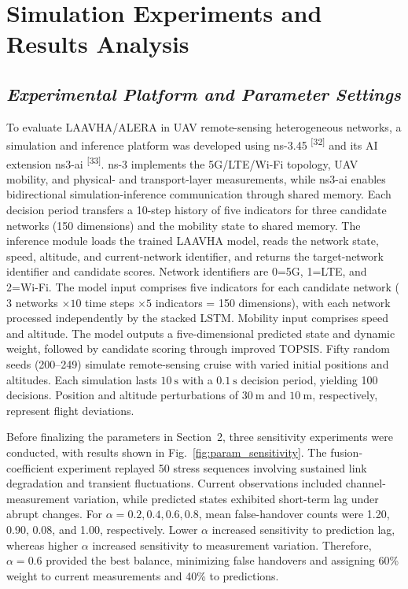 \documentclass[10pt,a4paper]{article}
\newcommand{\upcite}[1]{\textsuperscript{[#1]}}
\begin{document}
\section{Simulation Experiments and Results Analysis}

\subsection{\textmd{\textit{Experimental Platform and Parameter Settings}}}

To evaluate LAAVHA/ALERA in UAV remote-sensing heterogeneous networks, a simulation and inference platform was developed using ns-3.45 \upcite{32} and its AI extension ns3-ai \upcite{33}. ns-3 implements the 5G/LTE/Wi-Fi topology, UAV mobility, and physical- and transport-layer measurements, while ns3-ai enables bidirectional simulation-inference communication through shared memory. Each decision period transfers a 10-step history of five indicators for three candidate networks (150 dimensions) and the mobility state to shared memory. The inference module loads the trained LAAVHA model, reads the network state, speed, altitude, and current-network identifier, and returns the target-network identifier and candidate scores. Network identifiers are 0=5G, 1=LTE, and 2=Wi-Fi. The model input comprises five indicators for each candidate network ($3$ networks $\times10$ time steps $\times5$ indicators = 150 dimensions), with each network processed independently by the stacked LSTM. Mobility input comprises speed and altitude. The model outputs a five-dimensional predicted state and dynamic weight, followed by candidate scoring through improved TOPSIS. Fifty random seeds (200--249) simulate remote-sensing cruise with varied initial positions and altitudes. Each simulation lasts $10~\mathrm{s}$ with a $0.1~\mathrm{s}$ decision period, yielding 100 decisions. Position and altitude perturbations of $30~\mathrm{m}$ and $10~\mathrm{m}$, respectively, represent flight deviations.

Before finalizing the parameters in Section~2, three sensitivity experiments were conducted, with results shown in Fig.~\ref{fig:param_sensitivity}. The fusion-coefficient experiment replayed 50 stress sequences involving sustained link degradation and transient fluctuations. Current observations included channel-measurement variation, while predicted states exhibited short-term lag under abrupt changes. For $\alpha=0.2,0.4,0.6,0.8$, mean false-handover counts were 1.20, 0.90, 0.08, and 1.00, respectively. Lower $\alpha$ increased sensitivity to prediction lag, whereas higher $\alpha$ increased sensitivity to measurement variation. Therefore, $\alpha=0.6$ provided the best balance, minimizing false handovers and assigning 60\% weight to current measurements and 40\% to predictions.
\end{document}
